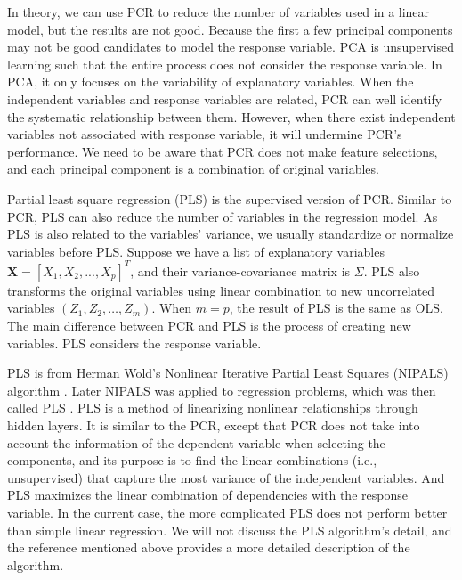 \documentclass[
  12pt,
]{krantz}
\begin{document}
In theory, we can use PCR to reduce the number of variables used in a linear model, but the results are not good. Because the first a few principal components may not be good candidates to model the response variable. PCA is unsupervised learning such that the entire process does not consider the response variable. In PCA, it only focuses on the variability of explanatory variables. When the independent variables and response variables are related, PCR can well identify the systematic relationship between them. However, when there exist independent variables not associated with response variable, it will undermine PCR's performance. We need to be aware that PCR does not make feature selections, and each principal component is a combination of original variables.

Partial least square regression (PLS)  is the supervised version of PCR. Similar to PCR, PLS can also reduce the number of variables in the regression model.   As PLS is also related to the variables' variance, we usually standardize or normalize variables before PLS. Suppose we have a list of explanatory variables \(\mathbf{X}=[X_{1},X_{2},...,X_{p}]^{T}\), and their variance-covariance matrix is \(\Sigma\). PLS also transforms the original variables using linear combination to new uncorrelated variables \((Z_{1} , Z_{2} , \ldots , Z_{m})\). When \(m=p\), the result of PLS is the same as OLS. The main difference between PCR and PLS is the process of creating new variables. PLS considers the response variable.

PLS is from Herman Wold's Nonlinear Iterative Partial Least Squares (NIPALS) algorithm \citep{wold1973, wold1982} . Later NIPALS was applied to regression problems, which was then called PLS . PLS is a method of linearizing nonlinear relationships through hidden layers. It is similar to the PCR, except that PCR does not take into account the information of the dependent variable when selecting the components, and its purpose is to find the linear combinations (i.e., unsupervised) that capture the most variance of the independent variables. And PLS maximizes the linear combination of dependencies with the response variable. In the current case, the more complicated PLS does not perform better than simple linear regression. We will not discuss the PLS algorithm's detail, and the reference mentioned above provides a more detailed description of the algorithm.
\end{document}
